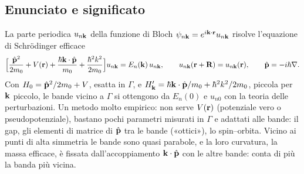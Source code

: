 \documentclass[11pt,a4paper]{article}
\begin{document}
\subsection{Enunciato e significato}
\begin{modello}\label{mod:kp}
La parte periodica $u_{n\mathbf k}$ della funzione di Bloch $\psi_{n\mathbf k}=e^{i\mathbf k\cdot\mathbf r}u_{n\mathbf k}$ risolve l'equazione di Schrödinger efficace
\[
\Bigl[\frac{\hat{\mathbf p}^2}{2m_0}+V(\mathbf r)+\frac{\hbar\mathbf k\cdot\hat{\mathbf p}}{m_0}+\frac{\hbar^2k^2}{2m_0}\Bigr]u_{n\mathbf k}=E_n(\mathbf k)\,u_{n\mathbf k},\qquad
u_{n\mathbf k}(\mathbf r+\mathbf R)=u_{n\mathbf k}(\mathbf r),\qquad \hat{\mathbf p}=-i\hbar\nabla .
\]
Con $H_0=\hat{\mathbf p}^2/2m_0+V$, esatta in $\Gamma$, e $H'_{\mathbf k}=\hbar\mathbf k\cdot\hat{\mathbf p}/m_0+\hbar^2k^2/2m_0$, piccola per $\mathbf k$ piccolo, le bande vicino a $\Gamma$
si ottengono da $E_n(0)$ e $u_{n0}$ con la teoria delle perturbazioni.
\tcblower
Un metodo molto empirico: non serve $V(\mathbf r)$ (potenziale vero o pseudopotenziale), bastano pochi parametri misurati in $\Gamma$ e adattati alle bande:
il gap, gli elementi di matrice di $\hat{\mathbf p}$ tra le bande («ottici»), lo spin--orbita. Vicino ai punti di alta simmetria le bande sono quasi parabole, e la
loro curvatura, la massa efficace, è fissata dall'accoppiamento $\mathbf k\cdot\hat{\mathbf p}$ con le altre bande: conta di più la banda più vicina.
\end{modello}
\end{document}
